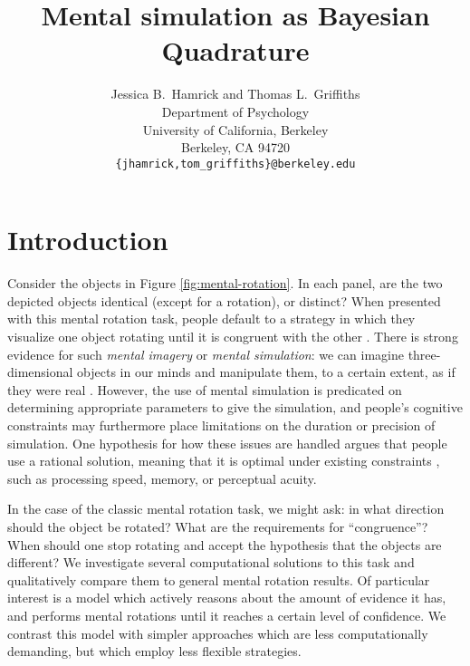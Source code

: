 \documentclass{article} %
\title{Mental simulation as Bayesian Quadrature}
\author{Jessica B.~Hamrick and Thomas L.~Griffiths\\
  Department of Psychology\\
  University of California, Berkeley\\
  Berkeley, CA 94720\\
  \texttt{\{jhamrick,tom\_griffiths\}@berkeley.edu}}
\newcommand{\TODO}[1]{\textcolor{red}{[TODO: #1]}}
\begin{document}
\maketitle



\section{Introduction}



Consider the objects in Figure \ref{fig:mental-rotation}. In each
panel, are the two depicted objects identical (except for a rotation),
or distinct? When presented with this mental rotation task, people
default to a strategy in which they visualize one object rotating
until it is congruent with the other \cite{Shepard1971}. There is
strong evidence for such \textit{mental imagery} or \textit{mental
  simulation}: we can imagine three-dimensional objects in our minds
and manipulate them, to a certain extent, as if they were real
\cite{Kosslyn:2009tj}.  However, the use of mental simulation is
predicated on determining appropriate parameters to give the
simulation, and people's cognitive constraints may furthermore place
limitations on the duration or precision of simulation. One hypothesis
for how these issues are handled argues that people use a rational
solution, meaning that it is optimal under existing constraints
\cite{Lieder:2012wg,Vul:2009wy,Griffiths2012a}, such as processing
speed, memory, or perceptual acuity.

In the case of the classic mental rotation task, we might ask: in what
direction should the object be rotated?  What are the requirements for
``congruence''? When should one stop rotating and accept the
hypothesis that the objects are different? We investigate several
computational solutions to this task and qualitatively compare them to
general mental rotation results. Of particular interest is a model
which actively reasons about the amount of evidence it has, and
performs mental rotations until it reaches a certain level of
confidence. We contrast this model with simpler approaches which are
less computationally demanding, but which employ less flexible
strategies.
\end{document}
